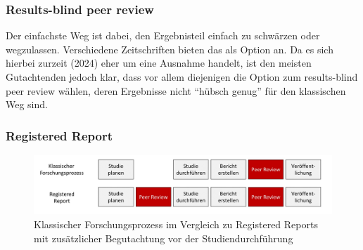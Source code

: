 \documentclass[
  letterpaper,
  DIV=11,
  numbers=noendperiod]{scrreprt}
\begin{document}
\subsubsection{Results-blind peer
review}\label{results-blind-peer-review}

Der einfachste Weg ist dabei, den Ergebnisteil einfach zu schwärzen oder
wegzulassen. Verschiedene Zeitschriften bieten das als Option an. Da es
sich hierbei zurzeit (2024) eher um eine Ausnahme handelt, ist den
meisten Gutachtenden jedoch klar, dass vor allem diejenigen die Option
zum results-blind peer review wählen, deren Ergebnisse nicht ``hübsch
genug'' für den klassischen Weg sind.

\subsubsection{Registered Report}\label{registered-report}

\begin{figure}[H]

{\centering \includegraphics{images/peerreview.jpg}

}

\caption{Klassischer Forschungsprozess im Vergleich zu Registered
Reports mit zusätzlicher Begutachtung vor der Studiendurchführung}

\end{figure}%
\end{document}
